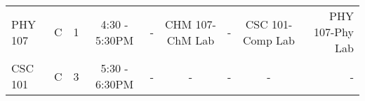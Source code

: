 \documentclass{article}
\begin{document}
\begin{sidewaystable}[h!]
\begin{center}
\begin{tabular}{l|c|r|c|c|c|l|c|r|}
			\cellcolor{blue!70}PHY 107 &\cellcolor{blue!35} C & \cellcolor{blue!35}1 &\cellcolor{blue!35} 4:30 - 5:30PM &\cellcolor{blue!35} - & \cellcolor{blue!35}CHM 107-ChM Lab & \cellcolor{blue!35}- &\cellcolor{blue!35} CSC 101-Comp Lab &\cellcolor{blue!70} PHY 107-Phy Lab                 \\
			\cellcolor{blue!70}CSC 101 & \cellcolor{blue!70}C & \cellcolor{blue!70}3 & \cellcolor{blue!70}5:30 - 6:30PM & \cellcolor{blue!70}- & \cellcolor{blue!70}- & -\cellcolor{blue!70} &\cellcolor{blue!70} - &\cellcolor{blue!70} -               
			
			
			\end{tabular}
		\end{center}
	\end{sidewaystable}
	
\end{document}
